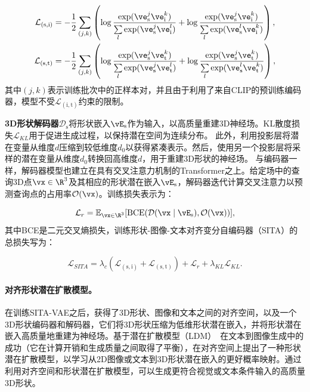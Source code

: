 \documentclass[../../book-main_zh.tex]{subfiles}
\begin{document}
\begin{equation}
\begin{aligned}
    \mathcal{L}_{(\mathrm{s},\mathrm{i})} &= - \frac{1}{2} \sum\limits_{(j,k)}
    \left(
        \log \frac{\exp (\ve_{\mathrm{s}}^j \ve_{\mathrm{i}}^k) }{
        \sum\limits_l \exp (\ve_{\mathrm{s}}^j \ve_{\mathrm{i}}^l) } +
        \log \frac{\exp (\ve_{\mathrm{s}}^j \ve_{\mathrm{i}}^k) }{
        \sum\limits_l \exp (\ve_{\mathrm{s}}^l \ve_{\mathrm{i}}^k) }
    \right), \\
    \mathcal{L}_{(\mathrm{s},\mathrm{t})}  &= - \frac{1}{2} \sum\limits_{(j,k)}
    \left(
        \log \frac{\exp (\ve_{\mathrm{s}}^j \ve_{\mathrm{t}}^k) }{
        \sum\limits_l \exp (\ve_{\mathrm{s}}^j \ve_{\mathrm{t}}^l) } +
        \log \frac{\exp (\ve_{\mathrm{s}}^j \ve_{\mathrm{t}}^k) }{
        \sum\limits_l \exp (\ve_{\mathrm{s}}^l \ve_{\mathrm{t}}^k) }
    \right), \\
\end{aligned}
\end{equation}
其中$(j,k)$表示训练批次中的正样本对，并且由于利用了来自CLIP的预训练编码器，模型不受$\mathcal{L}_{(\mathrm{i}, \mathrm{t})}$约束的限制。

\textbf{3D形状解码器}$\mathcal{D}_{\mathrm{s}}$将形状嵌入$\vE_{\mathrm{s}}$作为输入，以高质量重建3D神经场。KL散度损失$\mathcal{L}_{KL}$用于促进生成过程，以保持潜在空间为连续分布。
此外，利用投影层将潜在变量从维度$d$压缩到较低维度$d_0$以获得紧凑表示。然后，使用另一个投影层将采样的潜在变量从维度$d_0$转换回高维度$d$，用于重建3D形状的神经场。
与编码器一样，解码器模型也建立在具有交叉注意力机制的Transformer之上。给定场中的查询3D点$\vx \in \R^{3}$及其相应的形状潜在嵌入$\vE_{\mathrm{s}}$，解码器迭代计算交叉注意力以预测查询点的占用率$\mathcal{O} (\vx)$。训练损失表示为：

\begin{equation}
\mathcal{L}_r = \mathbb{E}_{\vx \in \R^3} [\text{BCE}(
\mathcal{D}(\vx \mid \vE_{\mathrm{s}} ), \mathcal{O}(\vx) )],
\end{equation}
其中BCE是二元交叉熵损失，训练形状-图像-文本对齐变分自编码器（SITA）的总损失写为：

\begin{equation}
\mathcal{L}_{SITA} = \lambda_c (\mathcal{L}_{(\mathrm{s},\mathrm{i})}
+ \mathcal{L}_{(\mathrm{s},\mathrm{t})}) + \mathcal{L}_r +
\lambda_{KL} \mathcal{L}_{KL}.
\label{eq:sita_vae}
\end{equation}

\paragraph{对齐形状潜在扩散模型。}
在训练SITA-VAE之后，获得了3D形状、图像和文本之间的对齐空间，以及一个3D形状编码器和解码器，它们将3D形状压缩为低维形状潜在嵌入，并将形状潜在嵌入高质量地重建为神经场。基于潜在扩散模型（LDM）~\cite{rombach2022high}在文本到图像生成中的成功（它在计算开销和生成质量之间取得了平衡），在对齐空间上提出了一种形状潜在扩散模型，以学习从2D图像或文本到3D形状潜在嵌入的更好概率映射。通过利用对齐空间和形状潜在扩散模型，可以生成更符合视觉或文本条件输入的高质量3D形状。
\end{document}
